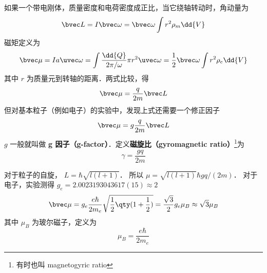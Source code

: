 


如果一个带电刚体，质量密度和电荷密度成正比，当它绕轴转动时，角动量为
\begin{equation}
\bvec L = I\bvec \omega  = \bvec \omega \int r^2 \rho_m \dd{V}
\end{equation}
磁矩定义为
\begin{equation}
\bvec \mu  = Ia \uvec\omega = \int \frac{\dd{Q}}{2\pi/\omega}  \pi r^2 \uvec \omega
= \frac12 \bvec \omega \int r^2\rho_e \dd{V} 
\end{equation}
其中 $r$ 为质量元到转轴的距离．两式比较，得
\begin{equation}
\bvec \mu  = \frac{q}{2m} \bvec L
\end{equation}
但对基本粒子（例如电子）的实验中，发现上式还需要一个修正因子
\begin{equation}
\bvec \mu  = g\frac{q}{2m}\bvec L
\end{equation}
$g$ 一般就叫做 \textbf{g 因子（g-factor）}．定义\textbf{磁旋比（gyromagnetic ratio）}\footnote{有时也叫 magnetogyric ratio}为
\begin{equation}
\gamma  = \frac{gq}{2m}
\end{equation}

对于粒子的自旋， $L = \hbar \sqrt{l(l + 1)} $． 所以 $\mu = \sqrt{l (l + 1)} \hbar gq/(2m)$． 
对于电子，实验测得 $g_e = 2.0023193043617(15) \approx 2$ 
\begin{equation}
\bvec \mu  = g_e \frac{e\hbar}{2 m_e} \sqrt{\frac12 \qty(1 + \frac12)}  = \frac{\sqrt 3}{2} g_e \mu_B \approx \sqrt 3 \mu_B
\end{equation}
其中 $\mu_B$ 为玻尔磁子，定义为
\begin{equation}
\mu_B = \frac{e\hbar}{2 m_e}
\end{equation}

